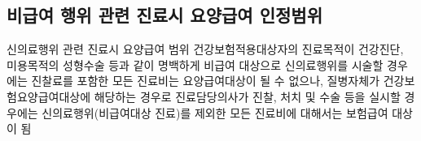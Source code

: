 \subsection{비급여 행위 관련 진료시 요양급여 인정범위}
\begin{commentbox}{신의료행위 관련 진료시 요양급여 범위}
건강보험적용대상자의 진료목적이 건강진단, 미용목적의 성형수술 등과 같이 명백하게 비급여 대상으로 신의료행위를 시술할 경우에는 진찰료를 포함한 모든 진료비는 요양급여대상이 될 수 없으나, 질병자체가 건강보험요양급여대상에 해당하는 경우로 진료담당의사가 진찰, 처치 및 수술 등을 실시할 경우에는 신의료행위(비급여대상 진료)를 제외한 모든 진료비에 대해서는 보험급여 대상이 됨
\end{commentbox}
